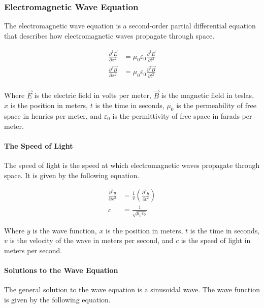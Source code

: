 \pagebreak

\subsubsection*{Electromagnetic Wave Equation}
The electromagnetic wave equation is a second-order partial differential equation that describes how electromagnetic waves propagate through space.

\begin{align*}
    \frac{\partial^2\vec{E}}{\partial x^2} &= \mu_0\varepsilon_0\frac{\partial^2\vec{E}}{\partial t^2}\\
    \frac{\partial^2\vec{B}}{\partial x^2} &= \mu_0\varepsilon_0\frac{\partial^2\vec{B}}{\partial t^2}\\
\end{align*}
    
Where $\vec{E}$ is the electric field in volts per meter, $\vec{B}$ is the magnetic field in teslas, $x$ is the position in meters, $t$ is the time 
in seconds, $\mu_0$ is the permeability of free space in henries per meter, and $\varepsilon_0$ is the permittivity of free space in farads per meter.\\

\paragraph{The Speed of Light}
The speed of light is the speed at which electromagnetic waves propagate through space. It is given by the following equation.

\begin{align*}
    \frac{\partial^2 y}{\partial x^2} &= \frac{1}{v}(\frac{\partial^2 y}{\partial t^2})\\
    c &= \frac{1}{\sqrt{\mu_0\varepsilon_0}}
\end{align*}

Where $y$ is the wave function, $x$ is the position in meters, $t$ is the time in seconds, $v$ is the velocity of the wave in meters per second,
and $c$ is the speed of light in meters per second.\\

\paragraph*{Solutions to the Wave Equation}
The general solution to the wave equation is a sinusoidal wave. The wave function is given by the following equation.
